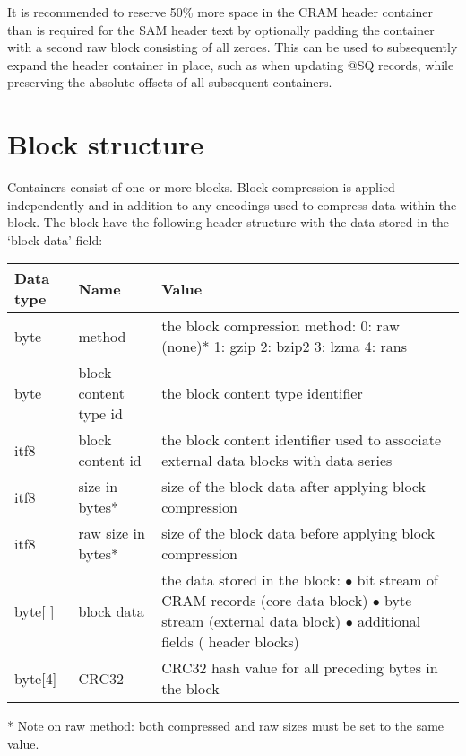 \documentclass[a4paper]{article}
\begin{document}
It is recommended to reserve 50\% more space in the CRAM header container than
is required for the SAM header text by optionally padding the container with a second
raw block consisting of all zeroes. This can be used to subsequently expand the header
container in place, such as when updating @SQ records, while preserving the absolute
offsets of all subsequent containers.

\section{\textbf{Block structure}}

Containers consist of one or more blocks. Block compression is applied independently 
and in addition to any encodings used to compress data within the block. The block 
have the following header structure with the data stored in the `block data' field:

\begin{tabular}{|l|>{\raggedright}p{120pt}|>{\raggedright}p{260pt}|}
\hline
\textbf{Data type} & \textbf{Name} & \textbf{Value}
\tabularnewline
\hline
byte & method & the block compression method: \linebreak{}
0: raw (none)*\linebreak{}
1: gzip\linebreak{}
2: bzip2\linebreak{}
3: lzma\linebreak{}
4: rans\tabularnewline
\hline
byte & block content type id & the block content type identifier\tabularnewline
\hline
itf8 & block content id & the block content identifier used to associate external 
data blocks with data series\tabularnewline
\hline
itf8 & size in bytes* & size of the block data after applying block compression\tabularnewline
\hline
itf8 & raw size in bytes* & size of the block data before applying block compression\tabularnewline
\hline
byte[ ] & block data & the data stored in the block:\linebreak{}
$\bullet$ bit stream of CRAM records (core data block)\linebreak{}
$\bullet$ byte stream (external data block)\linebreak{}
$\bullet$ additional fields ( header blocks)\tabularnewline
\hline
byte[4] & CRC32 & CRC32 hash value for all preceding bytes in the block\tabularnewline
\hline
\end{tabular}

* Note on raw method: both compressed and raw sizes must be set to the same value.
\end{document}

